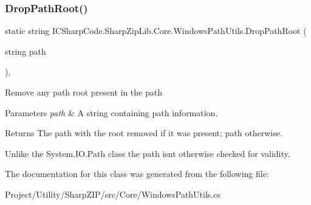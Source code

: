 \subsubsection{\texorpdfstring{Drop\+Path\+Root()}{DropPathRoot()}}
{\footnotesize\ttfamily static string I\+C\+Sharp\+Code.\+Sharp\+Zip\+Lib.\+Core.\+Windows\+Path\+Utils.\+Drop\+Path\+Root (\begin{DoxyParamCaption}\item[{string}]{path }\end{DoxyParamCaption})\hspace{0.3cm}{\ttfamily [inline]}, {\ttfamily [static]}}



Remove any path root present in the path 


\begin{DoxyParams}{Parameters}
{\em path} & A string containing path information.\\
\hline
\end{DoxyParams}
\begin{DoxyReturn}{Returns}
The path with the root removed if it was present; path otherwise.
\end{DoxyReturn}


Unlike the System.\+I\+O.\+Path class the path isnt otherwise checked for validity.

The documentation for this class was generated from the following file\+:\begin{DoxyCompactItemize}
\item 
Project/\+Utility/\+Sharp\+Z\+I\+P/src/\+Core/Windows\+Path\+Utils.\+cs\end{DoxyCompactItemize}
